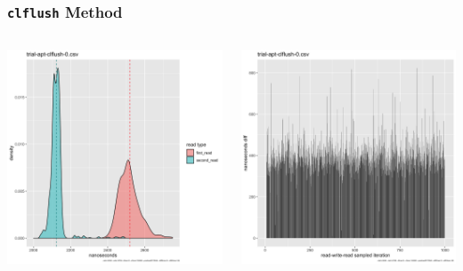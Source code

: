 \documentclass{beamer}
\begin{document}
\begin{frame}[fragile]
 \frametitle{\texttt{clflush} Method}
 \begin{columns}
  \begin{column}{0.5\textwidth}
   \includegraphics[width=\linewidth]{trial-apt-clflush-0-histogram.png}

  \end{column}
  \begin{column}{0.5\textwidth}
   \includegraphics[width=\linewidth]{trial-apt-clflush-0-barchart.png}

  \end{column}

 \end{columns}
\end{frame}
\end{document}
